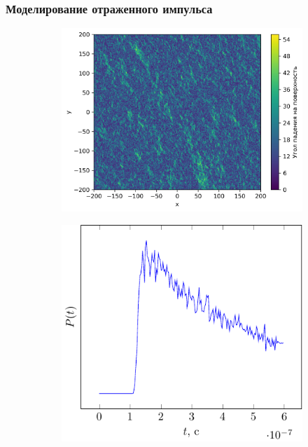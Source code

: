 \documentclass[10pt,pdf,hyperref={unicode}, dvipsnames]{beamer}
\begin{document}
\begin{frame}[t]
	\frametitle{Моделирование отраженного импульса}
    \begin{figure}[h]
        \begin{subfigure}{0.60\linewidth}
            \centering
            \includegraphics[width=\linewidth]{img/theta0}
        \end{subfigure}
        \begin{subfigure}{0.39\linewidth}
            \centering
            \includegraphics[width=\linewidth]{fig/theta}
        \end{subfigure}
    \end{figure}
\end{frame}
    
\end{document}
